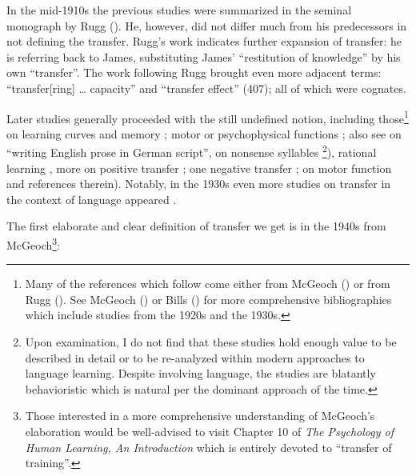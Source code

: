 \documentclass{article}
\begin{document}
In the mid-1910s the previous studies were summarized in the seminal monograph by Rugg (\citeyear{rugg_experimental_1916}). He, however, did not differ much from his predecessors in not defining the transfer. Rugg’s work indicates further expansion of transfer: he is referring back to James, substituting James’ ``restitution of knowledge'' by his own ``transfer''.  The work following Rugg brought even more adjacent terms: ``transfer[ring] … capacity'' \citep[][p. 406]{downey_automatic_1915} and ``transfer effect'' (407); all of which were cognates. 

Later studies generally proceeded with the still undefined notion, including those\footnote{Many of the references which follow come either from McGeoch (\citeyear{mcgeoch_psychology_1942}) or from Rugg (\citeyear{rugg_experimental_1916}). See McGeoch (\citeyear{mcgeoch_influence_1930}) or Bills (\citeyear{bills_general_1934}) for more comprehensive bibliographies which include studies from the 1920s and the 1930s.} on learning curves and memory \citep{martin_improvement_1929, dallenbach_effect_1914}; motor or psychophysical functions \citep{fernberger_effects_1916}; also see \cite{leuba_studies_1905} on ``writing English prose in German script'', on nonsense syllables \cite{melton_influence_1940}\footnote{Upon examination, I do not find that these studies hold enough value to be described in detail or to be re-analyzed within modern approaches to language learning. Despite involving language, the studies are blatantly behavioristic which is natural per the dominant approach of the time.}), rational learning \citep{ruger_psychology_1910, mcgeoch_influence_1930}, more on positive transfer \citep{sleight_memory_1911, reed_repetition_1917, mudge_transfer_1938}; one negative transfer \citep{archer_transfer_1928}; on motor function \citep{bills_general_1934} and references therein). Notably, in the 1930s even more studies on transfer in the context of language appeared \citep[e.g.,][]{johnson_language_1933}.

The first elaborate and clear definition of transfer we get is in the 1940s from McGeoch\footnote{Those interested in a more comprehensive understanding of McGeoch’s elaboration would be well-advised to visit Chapter 10 of \textit{The Psychology of Human Learning, An Introduction} which is entirely devoted to ``transfer of training''.}:
\end{document}

